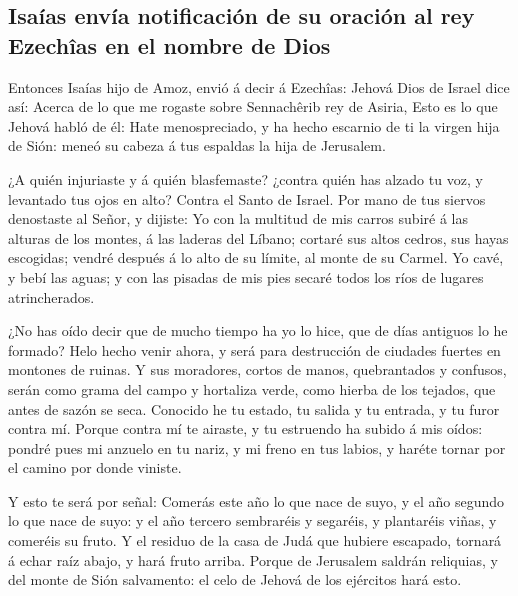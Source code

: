 \hypertarget{isauxedas-envuxeda-notificaciuxf3n-de-su-oraciuxf3n-al-rey-ezechuxeeas-en-el-nombre-de-dios}{%
\subsection{Isaías envía notificación de su oración al rey Ezechîas en
el nombre de
Dios}\label{isauxedas-envuxeda-notificaciuxf3n-de-su-oraciuxf3n-al-rey-ezechuxeeas-en-el-nombre-de-dios}}

 Entonces Isaías hijo de Amoz, envió á decir á Ezechîas:
Jehová Dios de Israel dice así: Acerca de lo que me rogaste sobre
Sennachêrib rey de Asiria,  Esto es lo que Jehová habló
de él: Hate menospreciado, y ha hecho escarnio de ti la virgen hija de
Sión: meneó su cabeza á tus espaldas la hija de Jerusalem.

 ¿A quién injuriaste y á quién blasfemaste? ¿contra quién
has alzado tu voz, y levantado tus ojos en alto? Contra el Santo de
Israel.  Por mano de tus siervos denostaste al Señor, y
dijiste: Yo con la multitud de mis carros subiré á las alturas de los
montes, á las laderas del Líbano; cortaré sus altos cedros, sus hayas
escogidas; vendré después á lo alto de su límite, al monte de su Carmel.
 Yo cavé, y bebí las aguas; y con las pisadas de mis pies
secaré todos los ríos de lugares atrincherados.

 ¿No has oído decir que de mucho tiempo ha yo lo hice,
que de días antiguos lo he formado? Helo hecho venir ahora, y será para
destrucción de ciudades fuertes en montones de ruinas.  Y
sus moradores, cortos de manos, quebrantados y confusos, serán como
grama del campo y hortaliza verde, como hierba de los tejados, que antes
de sazón se seca.  Conocido he tu estado, tu salida y tu
entrada, y tu furor contra mí.  Porque contra mí te
airaste, y tu estruendo ha subido á mis oídos: pondré pues mi anzuelo en
tu nariz, y mi freno en tus labios, y haréte tornar por el camino por
donde viniste.

 Y esto te será por señal: Comerás este año lo que nace
de suyo, y el año segundo lo que nace de suyo: y el año tercero
sembraréis y segaréis, y plantaréis viñas, y comeréis su fruto.
 Y el residuo de la casa de Judá que hubiere escapado,
tornará á echar raíz abajo, y hará fruto arriba.  Porque
de Jerusalem saldrán reliquias, y del monte de Sión salvamento: el celo
de Jehová de los ejércitos hará esto.

